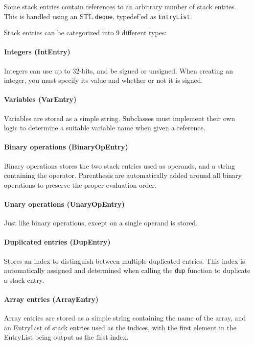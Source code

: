Some stack entries contain references to an arbitrary number of stack entries. This is handled using an STL \verb+deque+, typedef'ed as \verb+EntryList+.

Stack entries can be categorized into 9 different types:

\paragraph{Integers (IntEntry)}
Integers can use up to 32-bits, and be signed or unsigned. When creating an integer, you must specify its value and whether or not it is signed.
\paragraph{Variables (VarEntry)}
Variables are stored as a simple string. Subclasses must implement their own logic to determine a suitable variable name when given a reference.

\paragraph{Binary operations (BinaryOpEntry)}
Binary operations stores the two stack entries used as operands, and a string containing the operator. Parenthesis are automatically added around all binary operations to preserve the proper evaluation order.

\paragraph{Unary operations (UnaryOpEntry)}
Just like binary operations, except on a single operand is stored.

\paragraph{Duplicated entries (DupEntry)}
Stores an index to distinguish between multiple duplicated entries. This index is automatically assigned and determined when calling the \verb+dup+ function to duplicate a stack entry.

\paragraph{Array entries (ArrayEntry)}
Array entries are stored as a simple string containing the name of the array, and an EntryList of stack entries used as the indices, with the first element in the EntryList being output as the first index.

